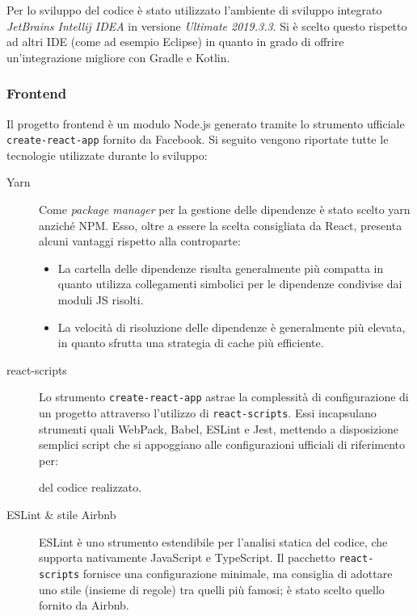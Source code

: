       Per lo sviluppo del codice è stato utilizzato l'ambiente di sviluppo integrato \emph{JetBrains Intellij IDEA} in versione \emph{Ultimate 2019.3.3}.
      Si è scelto questo rispetto ad altri IDE (come ad esempio Eclipse) in quanto in grado di offrire un'integrazione migliore con Gradle e Kotlin.

    \subsubsection{Frontend}

      Il progetto frontend è un modulo Node.js generato tramite lo strumento ufficiale \texttt{create-react-app} fornito da Facebook.
      Si seguito vengono riportate tutte le tecnologie utilizzate durante lo sviluppo:

      \begin{description}
        \item[Yarn]
          Come \emph{package manager} per la gestione delle dipendenze è stato scelto yarn anziché NPM\@.
          Esso, oltre a essere la scelta consigliata da React, presenta alcuni vantaggi rispetto alla controparte:
          \begin{itemize}
            \item La cartella delle dipendenze risulta generalmente più compatta in quanto utilizza collegamenti simbolici per le dipendenze condivise dai moduli JS risolti.
            \item La velocità di risoluzione delle dipendenze è generalmente più elevata, in quanto sfrutta una strategia di cache più efficiente.
          \end{itemize}

        \item[react-scripts]
          Lo strumento \texttt{create-react-app} astrae la complessità di configurazione di un progetto attraverso l'utilizzo di \texttt{react-scripts}.
          Essi incapsulano strumenti quali WebPack, Babel, ESLint e Jest, mettendo a disposizione semplici script che si appoggiano alle configurazioni ufficiali di riferimento per:
          del codice realizzato.

        \item[ESLint \& stile Airbnb]
          ESLint è uno strumento estendibile per l'analisi statica del codice, che supporta nativamente JavaScript e TypeScript.
          Il pacchetto \texttt{react-scripts} fornisce una configurazione minimale, ma consiglia di adottare uno stile (insieme di regole) tra quelli più famosi;
          è stato scelto quello fornito da Airbnb. %


\end{description}
